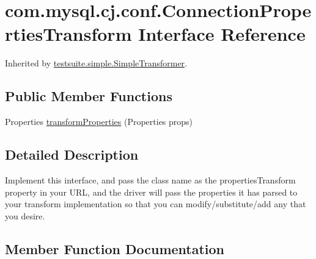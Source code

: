 \hypertarget{interfacecom_1_1mysql_1_1cj_1_1conf_1_1_connection_properties_transform}{}\section{com.\+mysql.\+cj.\+conf.\+Connection\+Properties\+Transform Interface Reference}
\label{interfacecom_1_1mysql_1_1cj_1_1conf_1_1_connection_properties_transform}


Inherited by \mbox{\hyperlink{classtestsuite_1_1simple_1_1_simple_transformer}{testsuite.\+simple.\+Simple\+Transformer}}.

\subsection*{Public Member Functions}
\begin{DoxyCompactItemize}
\item 
Properties \mbox{\hyperlink{interfacecom_1_1mysql_1_1cj_1_1conf_1_1_connection_properties_transform_ab1b0ebd09935c348ec99fb122e1a220b}{transform\+Properties}} (Properties props)
\end{DoxyCompactItemize}


\subsection{Detailed Description}
Implement this interface, and pass the class name as the \textquotesingle{}properties\+Transform\textquotesingle{} property in your U\+RL, and the driver will pass the properties it has parsed to your transform implementation so that you can modify/substitute/add any that you desire. 

\subsection{Member Function Documentation}
\mbox{\label{interfacecom_1_1mysql_1_1cj_1_1conf_1_1_connection_properties_transform_ab1b0ebd09935c348ec99fb122e1a220b}} 
